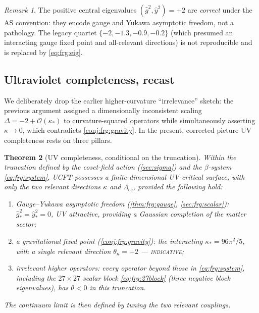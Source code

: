 \documentclass[11pt]{article}
\theoremstyle{plain}
\newtheorem{theorem}{Theorem}[section]
\theoremstyle{definition}
\theoremstyle{remark}
\newtheorem{remark}[theorem]{Remark}
\begin{document}
\begin{remark}
The positive central eigenvalues $(\hat g^{2},\hat y^{2})=+2$ are
\emph{correct} under the AS convention: they encode gauge and Yukawa
asymptotic freedom, not a pathology. The legacy quartet
$\{-2,-1.3,-0.9,-0.2\}$ (which presumed an interacting gauge fixed point
and all-relevant directions) is not reproducible and is replaced by
\eqref{eq:frg:eig}.
\end{remark}

\subsection{Ultraviolet completeness, recast}
\label{sec:frg:uvcomplete}

We deliberately drop the earlier higher-curvature ``irrelevance'' sketch:
the previous argument assigned a dimensionally inconsistent scaling
$\Delta=-2+\mathcal{O}(\kappa_{\ast})$ to curvature-squared operators while
simultaneously asserting $\kappa\to0$, which contradicts
\autoref{conj:frg:gravity}. In the present, corrected picture UV
completeness rests on three pillars.

\begin{theorem}[UV completeness, conditional on the truncation]
\label{thm:frg:uvcomplete}
Within the truncation defined by the coset-field action
(\autoref{sec:sigma}) and the $\beta$-system \eqref{eq:frg:system}, UCFT
possesses a finite-dimensional UV-critical surface, with only the two
relevant directions $\kappa$ and $\Lambda_{\mathrm{cc}}$, provided the
following hold:
\begin{enumerate}
  \item[\textnormal{(i)}] \emph{Gauge--Yukawa asymptotic freedom}
        (\autoref{thm:frg:gauge}, \autoref{sec:frg:scalar}):
        $\hat g^{2}_{\ast}=\hat y^{2}_{\ast}=0$, UV attractive, providing
        a Gaussian completion of the matter sector;
  \item[\textnormal{(ii)}] \emph{a gravitational fixed point}
        (\autoref{conj:frg:gravity}): the interacting
        $\kappa_{\ast}=96\pi^{2}/5$, with a single relevant direction
        $\theta_{\kappa}=+2$ --- \textsc{indicative};
  \item[\textnormal{(iii)}] \emph{irrelevant higher operators}: every
        operator beyond those in \eqref{eq:frg:system}, including the
        $27\times27$ scalar block \eqref{eq:frg:27block} (three negative
        block eigenvalues), has $\theta<0$ in this truncation.
\end{enumerate}
The continuum limit is then defined by tuning the two relevant couplings.
\end{theorem}
\end{document}
